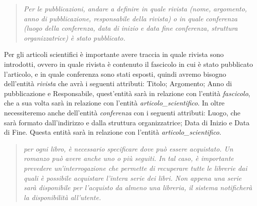 \documentclass{article}
\begin{document}
\begin{quote}
\textit{Per le pubblicazioni, andare a definire in quale rivista (nome, argomento, anno di pubblicazione, responsabile della rivista) o in quale conferenza (luogo della conferenza, data di inizio e data fine conferenza, struttura organizzatrice) è stato pubblicato.}
\end{quote}

Per gli articoli scientifici è importante avere traccia in quale rivista sono introdotti, ovvero in quale rivista è contenuto il fascicolo in cui è stato pubblicato l'articolo, e in quale conferenza sono stati esposti, quindi avremo bisogno dell'entità \textit{rivista} che avrà i seguenti attributi: Titolo; Argomento; Anno di pubblicazione e Responsabile, quest'entità sarà in relazione con l'entità \textit{fascicolo}, che a sua volta sarà in relazione con l'entità \textit{articolo\_scientifico}. In oltre necessiteremo anche dell'entità \textit{conferenza} con i seguenti attributi: Luogo, che sarà formato dall'indirizzo e dalla struttura organizzatrice; Data di Inizio e Data di Fine. Questa entità sarà in relazione con l'entità \textit{articolo\_scientifico}. 

\begin{quote}
\textit{per ogni libro, è necessario specificare dove può essere acquistato. Un romanzo può avere anche uno o più seguiti. In tal caso, è importante prevedere un’interrogazione che permette di recuperare tutte le librerie dai quali è possibile acquistare l’intera serie dei libri. Non appena una serie sarà disponibile per l’acquisto da almeno una libreria, il sistema notificherà la disponibilità all’utente.}
\end{quote}
\end{document}

